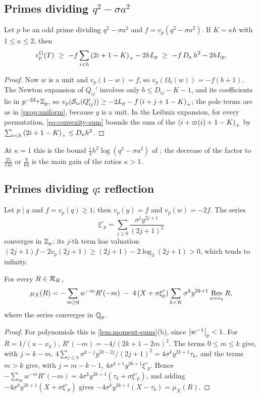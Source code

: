 \subsection{Primes dividing \texorpdfstring{$q^2-\sigma a^2$}{q²-σa²}}\label{subsec:p-divides-Y}

\begin{proposition}\label{prop:p-divides-Y}
Let $p$ be an odd prime dividing $q^2-\sigma a^2$ and $f=v_p(q^2-\sigma a^2)$. If $K=\kappa h$
with $1\le\kappa\le2$, then
\[
  \vG p(T)\ \ge\ -f\sum_{i<h}\pos{2i+1-K}-2hL_p\ \ge\ -f\,\Dk\,h^2-2hL_p .
\]
\end{proposition}

\begin{proof}
Now $w$ is a unit and $v_p(1-w)=f$, so $v_p(\Omega_b(w))=-f(b+1)$. The Newton expansion of
$Q_{ij}'$ involves only $b\le D_{ij}-K-1$, and its coefficients lie in $p^{-2L_p}\mathbb{Z}_p$, so
$v_p(\mathcal{S}_w(Q_{ij}'))\ge-2L_p-f\left(i+j+1-K\right)_{+}$; the pole terms are as in \cref{prop:uniform},
because $y$ is a unit. In the Leibniz expansion, for every permutation,
\eqref{eq:convexity-sum} bounds the sum of the $\left(i+\varpi(i)+1-K\right)_{+}$ by
$\sum_{i<h}\left(2i+1-K\right)_{+}\le D_\kappa h^2$.
\end{proof}

At $\kappa=1$ this is the bound $\frac14h^2\log(q^2-\sigma a^2)$ of
\cite[Lemma~5.1, Thm.~5.3]{Krisman2026chi2}; the decrease of the factor to $\frac{25}{144}$
or $\frac9{64}$ is the main gain of the ratios $\kappa>1$.

\subsection{Primes dividing \texorpdfstring{$q$}{q}: reflection}\label{subsec:p-divides-q}

Let $p\mid q$ and $f=v_p(q)\ge1$; then $v_p(y)=f$ and $v_p(w)=-2f$. The series
\[
  \xi'_p=\sum_{j\ge0}\frac{\sigma^jy^{2j+1}}{(2j+1)^2}
\]
converges in $\mathbb{Z}_p$: its $j$-th term has valuation $(2j+1)f-2v_p(2j+1)\ge(2j+1)-2\log_3(2j+1)>0$,
which tends to infinity.

\begin{lemma}\label{lem:reflection}
For every $R\in\mathcal{R}_K$,
\[
  \mu_X(R)=-\sum_{m\ge0}w^{-m}R'(-m)\;-\;4\,(X+\sigma\xi'_p)\sum_{k<K}\sigma^ky^{2k+1}
  \operatorname*{Res}_{u=x_k}R,
\]
where the series converges in $\mathbb{Q}_p$.
\end{lemma}

\begin{proof}
For polynomials this is \cref{lem:moment-sums}(b), since $\left\lvert w^{-1}\right\rvert_p<1$. For
$R=1/(u-x_k)$, $R'(-m)=-4/(2k+1-2m)^2$. The terms $0\le m\le k$ give, with $j=k-m$,
$4\sum_{j\le k}\sigma^{k-j}y^{2k-2j}/(2j+1)^2=4\sigma^ky^{2k+1}\tau_k$, and the terms $m>k$
give, with $j=m-k-1$, $4\sigma^{k+1}y^{2k+1}\xi'_p$. Hence
$-\sum_mw^{-m}R'(-m)=4\sigma^ky^{2k+1}(\tau_k+\sigma\xi'_p)$, and adding
$-4\sigma^ky^{2k+1}(X+\sigma\xi'_p)$ gives $-4\sigma^ky^{2k+1}(X-\tau_k)=\mu_X(R)$.
\end{proof}

